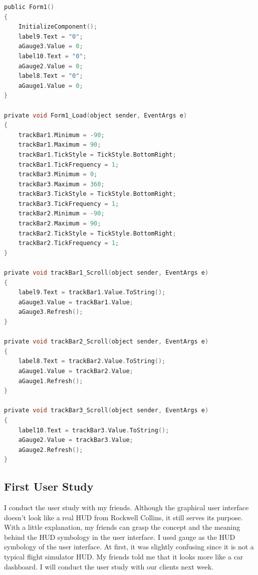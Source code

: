 \begin{lstlisting}[language=c]
public Form1()
{
    InitializeComponent();
    label9.Text = "0";
    aGauge3.Value = 0;
    label10.Text = "0";
    aGauge2.Value = 0;
    label8.Text = "0";
    aGauge1.Value = 0;
}

private void Form1_Load(object sender, EventArgs e)
{
    trackBar1.Minimum = -90;
    trackBar1.Maximum = 90;
    trackBar1.TickStyle = TickStyle.BottomRight;
    trackBar1.TickFrequency = 1;
    trackBar3.Minimum = 0;
    trackBar3.Maximum = 360;
    trackBar3.TickStyle = TickStyle.BottomRight;
    trackBar3.TickFrequency = 1;
    trackBar2.Minimum = -90;
    trackBar2.Maximum = 90;
    trackBar2.TickStyle = TickStyle.BottomRight;
    trackBar2.TickFrequency = 1;
}

private void trackBar1_Scroll(object sender, EventArgs e)
{
    label9.Text = trackBar1.Value.ToString();
    aGauge3.Value = trackBar1.Value;
    aGauge3.Refresh();
}

private void trackBar2_Scroll(object sender, EventArgs e)
{
    label8.Text = trackBar2.Value.ToString();
    aGauge1.Value = trackBar2.Value;
    aGauge1.Refresh();
}

private void trackBar3_Scroll(object sender, EventArgs e)
{
    label10.Text = trackBar3.Value.ToString();
    aGauge2.Value = trackBar3.Value;
    aGauge2.Refresh();
}
\end{lstlisting}

\subsection{First User Study}
I conduct the user study with my friends. Although the graphical user interface doesn’t look like a real HUD from Rockwell Collins, it still serves its purpose. With a little explanation, my friends can grasp the concept and the meaning behind the HUD symbology in the user interface. I used gauge as the HUD symbology of the user interface. At first, it was slightly confusing since it is not a typical flight simulator HUD. My friends told me that it looks more like a car dashboard. I will conduct the user study with our clients next week.  

